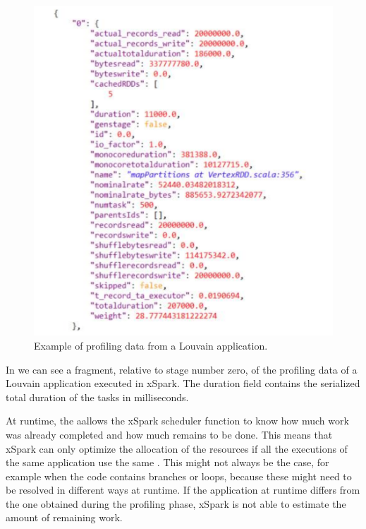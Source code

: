 \begin{figure}
	\centering
	\includegraphics[width=\columnwidth]{Images/profile_fragment.pdf}  
	\caption[Example of profiling data from a Louvain application]{Example of profiling data from a Louvain application.}
	\label{fig:profileFragment}
\end{figure}

In  we can see a fragment, relative to stage number zero, of the profiling data of a Louvain application executed in xSpark.
The duration field contains the serialized total duration of the tasks in milliseconds.

At runtime, the a\plan allows the xSpark scheduler function to know how much
work was already completed and how much remains to be done. This means that xSpark can only optimize the allocation of the resources if all the executions of the same application use the same \plan. This might not always be the case, for example when the code contains branches or loops, because these might need to be resolved in different ways at runtime. If the application \plan at runtime differs from the one obtained during the profiling phase, xSpark is not able to estimate the amount of remaining work. 

